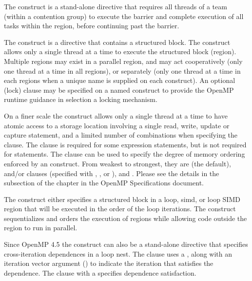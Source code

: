 \label{chap:synchronization}

The  construct is a stand-alone directive that requires all threads
of a team (within a contention group) to execute the barrier and complete
execution of all tasks within the region, before continuing past the barrier.

The  construct is a directive that contains a structured block. 
The construct allows only a single thread at a time to execute the structured block (region).
Multiple  regions may exist in a parallel region, and may
act cooperatively (only one thread at a time in all  regions),
or separately (only one thread at a time in each  regions when
a unique name is supplied on each  construct).
An optional (lock)  clause may be specified on a named  
construct to provide the OpenMP runtime guidance in selection a locking 
mechanism.

On a finer scale the  construct allows only a single thread at 
a time to have atomic access to a storage location involving a single read, 
write, update or capture statement, and a limited number of combinations 
when specifying the   clause.  The
 clause is required for some expression statements, but is
not required for  statements. The  clause can be
used to specify the degree of memory ordering enforced by an 
construct. From weakest to strongest, they are  (the default),
 and/or  clauses (specified with , ,
or ), and .  Please see the details in the
 subsection of the  chapter in the OpenMP
Specifications document.

The  construct either specifies a structured block in a loop, 
simd, or loop SIMD region that will be executed in the order of the loop 
iterations.  The  construct sequentializes and orders the execution
of  regions while allowing code outside the region to run in parallel.

Since OpenMP 4.5 the  construct can also be a stand-alone 
directive that specifies cross-iteration dependences in a  loop nest.
The  clause uses a  , along with an 
iteration vector argument () to indicate the iteration that satisfies the
dependence.  The  clause with a 
 specifies dependence satisfaction.

